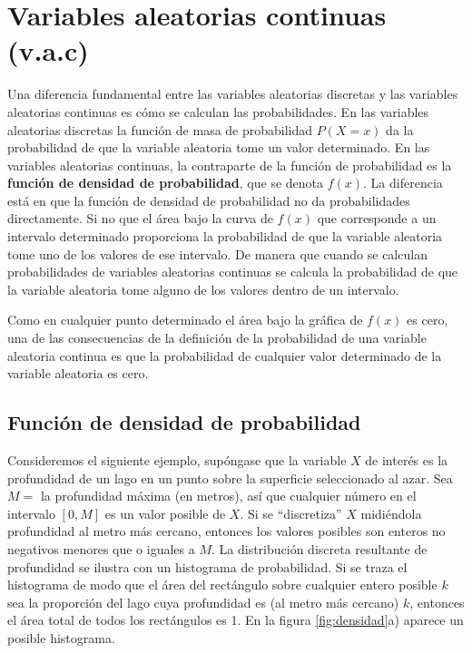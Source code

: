 \documentclass[
  11pt,
]{book}
\theoremstyle{definition}
\theoremstyle{definition}
\theoremstyle{definition}
\theoremstyle{definition}
\theoremstyle{remark}
\begin{document}
\section{Variables aleatorias continuas (v.a.c)}\label{variables-aleatorias-continuas-v.a.c}

Una diferencia fundamental entre las variables aleatorias discretas y las variables aleatorias continuas es cómo se calculan las probabilidades. En las variables aleatorias discretas la función de masa de probabilidad \(P(X=x)\) da la probabilidad de que la variable aleatoria tome un valor determinado. En las variables aleatorias continuas, la contraparte de la función de probabilidad es la \textbf{función de densidad de probabilidad}, que se denota \(f(x)\). La diferencia está en que la función de densidad de probabilidad no da probabilidades directamente. Si no que el área bajo la curva de \(f(x)\) que corresponde a un intervalo determinado proporciona la probabilidad de que la variable aleatoria tome uno de los valores de ese intervalo. De manera que cuando se calculan probabilidades de variables aleatorias continuas se calcula la probabilidad de que la variable aleatoria tome alguno de los valores dentro de un intervalo.

Como en cualquier punto determinado el área bajo la gráfica de \(f(x)\) es cero, una de las consecuencias de la definición de la probabilidad de una variable aleatoria continua es que la probabilidad de cualquier valor determinado de la variable aleatoria es cero. \citep[página 227]{anderson}

\subsection{Función de densidad de probabilidad}\label{funciuxf3n-de-densidad-de-probabilidad}

Consideremos el siguiente ejemplo, supóngase que la variable \(X\) de interés es la profundidad de un lago en un punto sobre la superficie seleccionado al azar. Sea \(M =\) la profundidad máxima (en metros), así que cualquier número en el intervalo \([0, M]\) es un valor posible de \(X\). Si se ``discretiza'' \(X\) midiéndola profundidad al metro más cercano, entonces los valores posibles son enteros no negativos menores que o iguales a \(M\). La distribución discreta resultante de profundidad se ilustra con un histograma de probabilidad. Si se traza el histograma de modo que el área del rectángulo sobre cualquier entero posible \(k\) sea la proporción del lago cuya profundidad es (al metro más cercano) \(k\), entonces el área total de todos los rectángulos es 1. En la figura \ref{fig:densidad}a) aparece un posible histograma.
\end{document}

